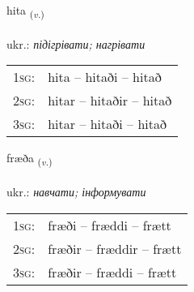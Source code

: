 \documentclass[frontgrid, backgrid]{flacards}\usepackage[]{graphicx}\usepackage[]{xcolor}
\begin{document}
\renewcommand{\blhead}{\vskip5pt {\small\bfseries\footnotesize Sagnorð | дієслово }}
\renewcommand{\bcfoot}{\vskip5pt \hspace{2pt}{\small\bfseries\footnotesize 3K}}


{hita \small{\textsubscript{(\textit{v.})}} \\[1ex] %
\textphonetic{[hɪːta]} \\
ukr.: \emph{підігрівати; нагрівати} \\  [2ex]
\renewcommand*{\arraystretch}{0.8}
\begin{tabular}{p{1cm}l}
\textsc{1sg}: & hita -- hitaði -- hitað \\ 
\textsc{2sg}: & hitar -- hitaðir -- hitað \\ 
\textsc{3sg}: & hitar -- hitaði -- hitað \\ 
\end{tabular}
}

\renewcommand{\flhead}{\vskip5pt \fboxsep=0pt {\small\bfseries\footnotesize Sagnorð | дієслово}}
\renewcommand{\fcfoot}{\vskip5pt \fboxsep=0pt \hspace{2pt}{\small\bfseries\footnotesize 3K}}

\renewcommand{\blhead}{\vskip5pt {\small\bfseries\footnotesize Sagnorð | дієслово }}
\renewcommand{\bcfoot}{\vskip5pt \hspace{2pt}{\small\bfseries\footnotesize 3K}}


{fræða \small{\textsubscript{(\textit{v.})}} \\[1ex] %
\textphonetic{[fraiːða]} \\
ukr.: \emph{навчати; інформувати} \\  [2ex]
\renewcommand*{\arraystretch}{0.8}
\begin{tabular}{p{1cm}l}
\textsc{1sg}: & fræði -- fræddi -- frætt \\ 
\textsc{2sg}: & fræðir -- fræddir -- frætt \\ 
\textsc{3sg}: & fræðir -- fræddi -- frætt \\ 
\end{tabular}
}
\end{document}
